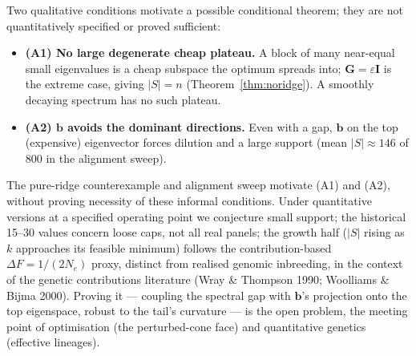 \documentclass[11pt]{article}
\theoremstyle{plain}
\newcommand{\bb}{\mathbf{b}}
\newcommand{\bG}{\mathbf{G}}
\begin{document}
Two qualitative conditions motivate a possible conditional theorem; they are not quantitatively specified or proved sufficient:
\begin{itemize}
\item \textbf{(A1) No large degenerate cheap plateau.} A block of many near-equal small eigenvalues is
  a cheap subspace the optimum spreads into; $\bG = \varepsilon\mathbf{I}$ is the extreme case, giving
  $|S| = n$ (Theorem~\ref{thm:noridge}). A smoothly decaying spectrum has no such plateau.
\item \textbf{(A2) $\bb$ avoids the dominant directions.} Even with a gap, $\bb$ on the top (expensive)
  eigenvector forces dilution and a large support (mean $|S| \approx 146$ of $800$ in the alignment
  sweep).
\end{itemize}
The pure-ridge counterexample and alignment sweep motivate (A1) and (A2), without proving necessity of these informal conditions. Under quantitative versions at a specified operating point we conjecture small support; the historical 15--30 values concern loose caps, not all real panels; the growth half
($|S|$ rising as $k$ approaches its feasible minimum) follows the
contribution-based $\Delta F=1/(2N_e)$ proxy, distinct from realised genomic inbreeding, in the context of the genetic contributions literature (Wray \& Thompson 1990;
Woolliams \& Bijma 2000). Proving it --- coupling the spectral gap with $\bb$'s projection onto the
top eigenspace, robust to the tail's curvature --- is the open problem, the meeting point of
optimisation (the perturbed-cone face) and quantitative genetics (effective lineages).
\end{document}
